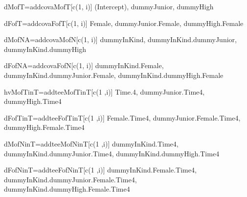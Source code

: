 dMofT=addcovaMofT[c(1, i)] (Intercept), dummyJunior, dummyHigh

dFofT=addcovaFofT[c(1, i)] Female, dummyJunior.Female, dummyHigh.Female

dMofNA=addcovaMofN[c(1, i)] dummyInKind, dummyInKind.dummyJunior, dummyInKind.dummyHigh

dFofNA=addcovaFofN[c(1, i)] dummyInKind.Female, dummyInKind.dummyJunior.Female, dummyInKind.dummyHigh.Female

hvMofTinT=addteeMofTinT[c(1 ,i)] Time.4, dummyJunior.Time4, dummyHigh.Time4

dFofTinT=addteeFofTinT[c(1 ,i)] Female.Time4, dummyJunior.Female.Time4, dummyHigh.Female.Time4

dMofNinT=addteeMofNinT[c(1 ,i)] dummyInKind.Time4, dummyInKind.dummyJunior.Time4, dummyInKind.dummyHigh.Time4

dFofNinT=addteeFofNinT[c(1 ,i)] dummyInKind.Female.Time4, dummyInKind.dummyJunior.Female.Time4, dummyInKind.dummyHigh.Female.Time4

